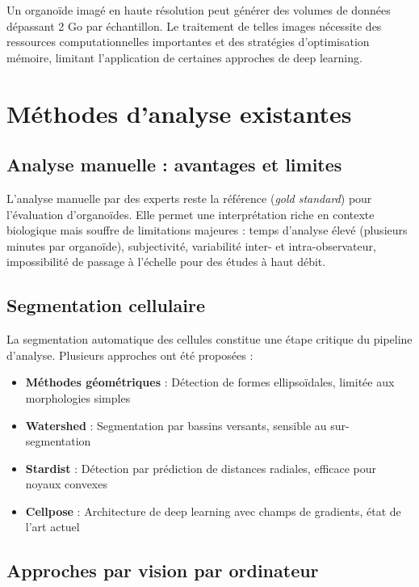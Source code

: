 Un organoïde imagé en haute résolution peut générer des volumes de données dépassant 2 Go par échantillon. Le traitement de telles images nécessite des ressources computationnelles importantes et des stratégies d'optimisation mémoire, limitant l'application de certaines approches de deep learning.

\section{Méthodes d'analyse existantes}

\subsection{Analyse manuelle : avantages et limites}

L'analyse manuelle par des experts reste la référence (\textit{gold standard}) pour l'évaluation d'organoïdes. Elle permet une interprétation riche en contexte biologique mais souffre de limitations majeures : temps d'analyse élevé (plusieurs minutes par organoïde), subjectivité, variabilité inter- et intra-observateur, impossibilité de passage à l'échelle pour des études à haut débit.

\subsection{Segmentation cellulaire}

La segmentation automatique des cellules constitue une étape critique du pipeline d'analyse. Plusieurs approches ont été proposées :
\begin{itemize}
    \item \textbf{Méthodes géométriques} : Détection de formes ellipsoïdales, limitée aux morphologies simples
    \item \textbf{Watershed} : Segmentation par bassins versants, sensible au sur-segmentation
    \item \textbf{Stardist} : Détection par prédiction de distances radiales, efficace pour noyaux convexes
    \item \textbf{Cellpose} : Architecture de deep learning avec champs de gradients, état de l'art actuel
\end{itemize}

\subsection{Approches par vision par ordinateur}

